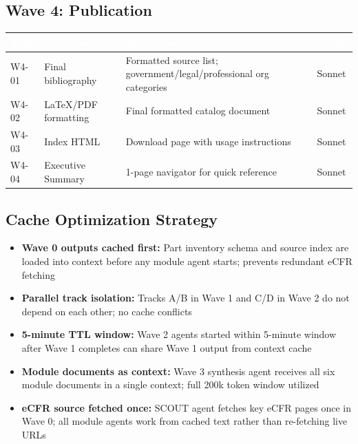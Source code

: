 \documentclass[11pt,letterpaper]{article}
\newcommand{\tableheader}[1]{\textbf{\sffamily\textcolor{white}{#1}}}
\begin{document}
\subsection{Wave 4: Publication}

\begin{center}
\begin{tabularx}{\textwidth}{C{1.5cm}L{4cm}XC{1.5cm}}
\toprule
{}
\tableheader{Task} & \tableheader{Component} & \tableheader{Description} & \tableheader{Model} \\
\midrule
W4-01 & Final bibliography & Formatted source list; government/legal/professional org categories & Sonnet \\
W4-02 & LaTeX/PDF formatting & Final formatted catalog document & Sonnet \\
W4-03 & Index HTML & Download page with usage instructions & Sonnet \\
W4-04 & Executive Summary & 1-page navigator for quick reference & Sonnet \\
\bottomrule
\end{tabularx}
\end{center}

\subsection{Cache Optimization Strategy}

\begin{itemize}[leftmargin=1.5em]
  \item \textbf{Wave 0 outputs cached first:} Part inventory schema and source index are loaded into context before any module agent starts; prevents redundant eCFR fetching
  \item \textbf{Parallel track isolation:} Tracks A/B in Wave 1 and C/D in Wave 2 do not depend on each other; no cache conflicts
  \item \textbf{5-minute TTL window:} Wave 2 agents started within 5-minute window after Wave 1 completes can share Wave 1 output from context cache
  \item \textbf{Module documents as context:} Wave 3 synthesis agent receives all six module documents in a single context; full 200k token window utilized
  \item \textbf{eCFR source fetched once:} SCOUT agent fetches key eCFR pages once in Wave 0; all module agents work from cached text rather than re-fetching live URLs
\end{itemize}
\end{document}
